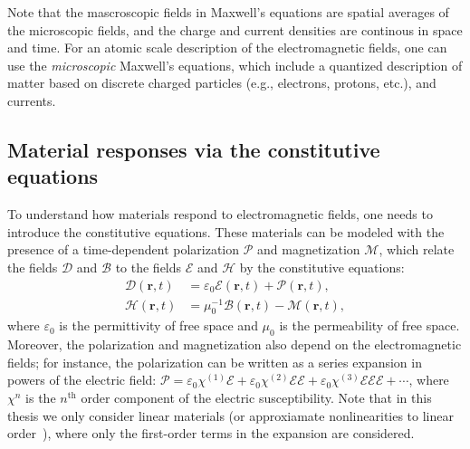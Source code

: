 Note that the mascroscopic fields in Maxwell's equations
are spatial averages of the
microscopic fields, and the charge and current densities are continous in space
and time.
For an atomic scale description of the electromagnetic fields, one can use the
\emph{microscopic}
Maxwell's equations, which include a quantized description of matter based on
discrete charged particles
(e.g., electrons, protons, etc.), and currents.\\

\subsection*{Material responses via the constitutive equations}

To understand how materials respond to electromagnetic fields,
one needs to introduce the constitutive equations. These materials can be
modeled
with the presence of a time-dependent polarization $\bm{\mathcal{P}}$ and
magnetization $\bm{\mathcal{M}}$,
which relate the fields $\bm{\mathcal{D}}$ and $\bm{\mathcal{B}}$ to the fields
$\bm{\mathcal{E}}$ and
$\bm{\mathcal{H}}$ by the constitutive equations:
\begin{align}
    \bm{\mathcal{D}}(\mathbf{r}, t) & = \varepsilon_0
    \bm{\mathcal{E}}(\mathbf{r}, t) + \bm{\mathcal{P}}(\mathbf{r}, t),
    \label{eq:D}                                                                \\
    \bm{\mathcal{H}}(\mathbf{r}, t) & = \mu_0^{-1} \bm{\mathcal{B}}(\mathbf{r},
    t) - \bm{\mathcal{M}}(\mathbf{r}, t) \label{eq:H},
\end{align}
where $\varepsilon_0$ is the permittivity of free space and $\mu_0$ is the
permeability of free space.
Moreover, the polarization and magnetization also depend on the electromagnetic
fields; for instance, the
polarization can be written as a series expansion in powers of the electric
field:
$\bm{\mathcal{P}}=\mathcal{\varepsilon}_0 \bm{\mathcal{\chi}}^{(1)}
    \bm{\mathcal{E}}+\mathcal{\varepsilon}_0 \bm{\mathcal{\chi}}^{(2)}
    \bm{\mathcal{E}} \bm{\mathcal{E}}+\mathcal{\varepsilon}_0
    \bm{\mathcal{\chi}}^{(3)} \bm{\mathcal{E}} \bm{\mathcal{E}}
    \bm{\mathcal{E}}+\cdots$,
where $\bm{\mathcal{\chi}}^{n}$ is the $n^\text{th}$ order component of the
electric susceptibility. Note that in this thesis
we only consider linear materials (or approxiamate nonlinearities to linear
order~\cite{ownpub4}), where only the first-order terms in the expansion are
considered. \\

